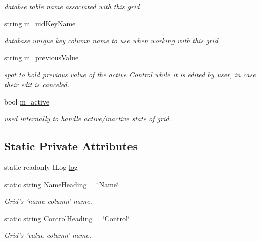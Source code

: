 \begin{DoxyCompactItemize}
\begin{DoxyCompactList}\small\item\em databse table name associated with this grid \item\end{DoxyCompactList}\item 
string \hyperlink{class_ias_pbx_config_1_1_name_value_grid_ace4c5d89cfdadc8de017dcbc9898a7fe}{m\_\-uidKeyName}
\begin{DoxyCompactList}\small\item\em database unique key column name to use when working with this grid \item\end{DoxyCompactList}\item 
string \hyperlink{class_ias_pbx_config_1_1_name_value_grid_a7da8312b72dfd2438197fbb2e32a1daa}{m\_\-previousValue}
\begin{DoxyCompactList}\small\item\em spot to hold previous value of the active Control while it is edited by user, in case their edit is canceled. \item\end{DoxyCompactList}\item 
bool \hyperlink{class_ias_pbx_config_1_1_name_value_grid_a0177cb7f2195d16203835db6e41c2823}{m\_\-active}
\begin{DoxyCompactList}\small\item\em used internally to handle active/inactive state of grid. \item\end{DoxyCompactList}\end{DoxyCompactItemize}
\subsection*{Static Private Attributes}
\begin{DoxyCompactItemize}
\item 
static readonly ILog \hyperlink{class_ias_pbx_config_1_1_name_value_grid_acdf8c458a67f3fd92adbbe8878b9067d}{log}
\item 
static string \hyperlink{class_ias_pbx_config_1_1_name_value_grid_add49a07f2a41723711cae88d6a6f7360}{NameHeading} = \char`\"{}Name\char`\"{}
\begin{DoxyCompactList}\small\item\em Grid's 'name column' name. \item\end{DoxyCompactList}\item 
static string \hyperlink{class_ias_pbx_config_1_1_name_value_grid_a9ce813f75fb383103a34150e0e7643e5}{ControlHeading} = \char`\"{}Control\char`\"{}
\begin{DoxyCompactList}\small\item\em Grid's 'value column' name. \item\end{DoxyCompactList}\end{DoxyCompactItemize}


